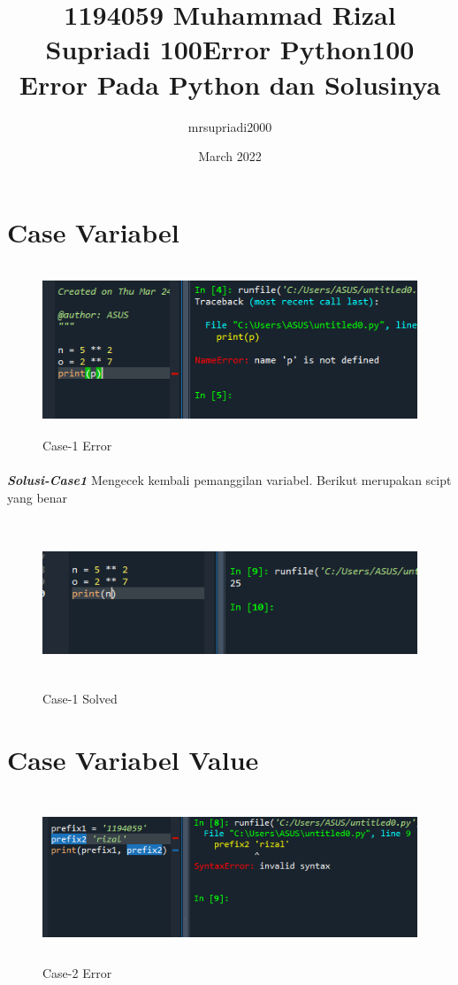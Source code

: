 \documentclass[12pt,a4paper]{article}
\title{1194059 Muhammad Rizal Supriadi 100Error Python}
\author{mrsupriadi2000}
\date{March 2022}
\begin{document}
\maketitle
\thispagestyle{empty}
\newpage
\title{100 Error Pada Python dan Solusinya}
\section{Case Variabel}
\begin{figure}[ht]
    \centerline{\includegraphics[width=15cm,height=5cm]{image/case1.png}}
    \renewcommand{\figurename}{Gambar}
    \caption{Case-1 Error}
\end{figure}
\paragraph{}\textbf{\textit{Solusi-Case1}} { Mengecek kembali pemanggilan variabel. Berikut merupakan scipt yang benar}
\begin{figure}[ht]
    \centerline{\includegraphics[width=15cm,height=5cm]{image/case1-solved.png}}
    \renewcommand{\figurename}{Gambar}
    \caption{Case-1 Solved}
\end{figure}

\newpage
\section{Case Variabel Value}
\begin{figure}[ht]
    \centerline{\includegraphics[width=15cm,height=5cm]{image/case2.png}}
    \renewcommand{\figurename}{Gambar}
    \caption{Case-2 Error}
\end{figure}
\end{document}
